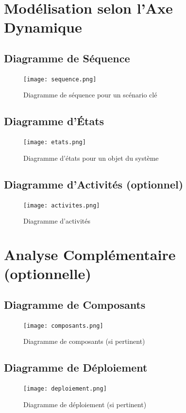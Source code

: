 \documentclass{article}
\begin{document}
\section{Modélisation selon l'Axe Dynamique}
\subsection{Diagramme de Séquence}
\begin{figure}[H]
    \centering
    \texttt{[image: sequence.png]}
    \caption{Diagramme de séquence pour un scénario clé}
\end{figure}

\subsection{Diagramme d’États}
\begin{figure}[H]
    \centering
    \texttt{[image: etats.png]}
    \caption{Diagramme d’états pour un objet du système}
\end{figure}

\subsection{Diagramme d’Activités (optionnel)}
\begin{figure}[H]
    \centering
    \texttt{[image: activites.png]}
    \caption{Diagramme d’activités}
\end{figure}

\section{Analyse Complémentaire (optionnelle)}
\subsection{Diagramme de Composants}
\begin{figure}[H]
    \centering
    \texttt{[image: composants.png]}
    \caption{Diagramme de composants (si pertinent)}
\end{figure}

\subsection{Diagramme de Déploiement}
\begin{figure}[H]
    \centering
    \texttt{[image: deploiement.png]}
    \caption{Diagramme de déploiement (si pertinent)}
\end{figure}
\end{document}
